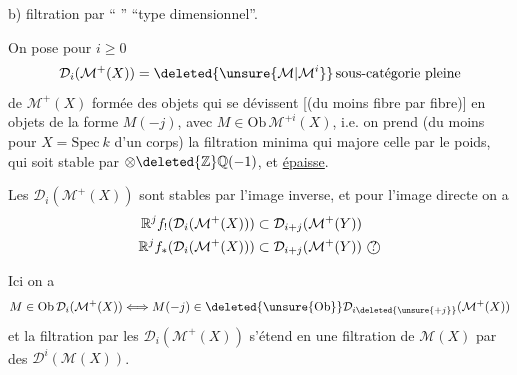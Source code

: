 b) filtration par `` '' ``type dimensionnel''. %

On pose pour $i\geq 0$ %
\[\mathcal D_i(\mathcal M^+(X))=\deleted{\unsure{\mathcal M|\mathcal M^i}}\,\text{sous-catégorie pleine}\] %
de $\mathcal M^+(X)$ formée des objets %
qui se  dévissent [(du moins %
fibre par fibre)] en objets %
de la forme %
 $M(-j)$, avec $M\in\mathrm{Ob}\,\mathcal M^{+i}(X)$, %
i.e. on prend (du moins pour $X=\mathrm{Spec}\ k$ d'un %
corps) la filtration minima qui %
majore celle par le poids,  qui soit %
stable par $\otimes\deleted{\mathbb Z}\mathbb Q(-1)$, et \uline{épaisse}. %

Les $\mathcal D_i(\mathcal M^+(X))$ sont stables par l'image inverse, %
et pour l'image directe on a %
\[\begin{aligned}\mathbb R^j f_!(\mathcal D_i(\mathcal M^+(X)))&\subset\mathcal D_{i+j}(\mathcal M^+(Y))\\ %
\mathbb R^j f_*(\mathcal D_i(\mathcal M^+(X)))&\subset\mathcal D_{i+j}(\mathcal M^+(Y))\ \text{\textcircled{?}}\end{aligned}\] %

Ici  on a %
\[M\in\mathrm{Ob}\,\mathcal D_i(\mathcal M^+(X))\Longleftrightarrow M(-j)\in\deleted{\unsure{\mathrm{Ob}}}\mathcal D_{i\deleted{\unsure{+j}}}(\mathcal M^+(X))\] %
et la filtration  par les $\mathcal D_i(\mathcal M^+(X))$ s'étend %
en une filtration de $\mathcal M(X)$ par des $\mathcal D^i(\mathcal M(X))$. %

